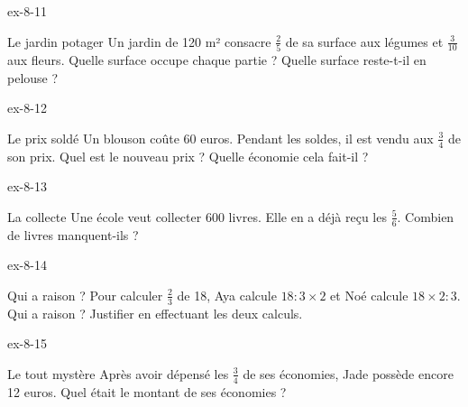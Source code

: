 \begin{blocLivre}{ex-8-11}\begin{exercice}[3]{Le jardin potager}
Un jardin de 120 m² consacre $\frac25$ de sa surface aux légumes et $\frac3{10}$ aux fleurs. Quelle surface occupe chaque partie ? Quelle surface reste-t-il en pelouse ?
\end{exercice}\end{blocLivre}
\begin{blocLivre}{ex-8-12}\begin{exercice}[3]{Le prix soldé}
Un blouson coûte 60 euros. Pendant les soldes, il est vendu aux $\frac34$ de son prix. Quel est le nouveau prix ? Quelle économie cela fait-il ?
\end{exercice}\end{blocLivre}
\begin{blocLivre}{ex-8-13}\begin{exercice}[3]{La collecte}
Une école veut collecter 600 livres. Elle en a déjà reçu les $\frac56$. Combien de livres manquent-ils ?
\end{exercice}\end{blocLivre}
\begin{blocLivre}{ex-8-14}\begin{exercice}[3]{Qui a raison ?}
Pour calculer $\frac23$ de 18, Aya calcule $18:3\times2$ et Noé calcule $18\times2:3$. Qui a raison ? Justifier en effectuant les deux calculs.
\end{exercice}\end{blocLivre}
\begin{blocLivre}{ex-8-15}\begin{exercice}[3]{Le tout mystère}
Après avoir dépensé les $\frac34$ de ses économies, Jade possède encore 12 euros. Quel était le montant de ses économies ?
\end{exercice}\end{blocLivre}

\clearpage
